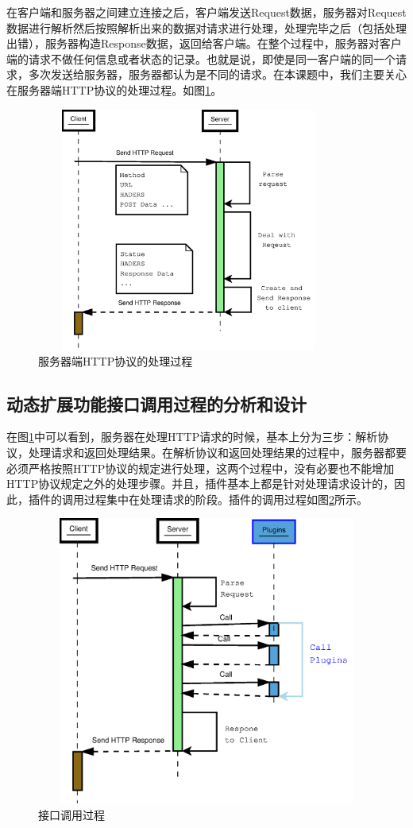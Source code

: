 \documentclass[12pt, twoside, a4paper, xetex]{report}
\begin{document}
	在客户端和服务器之间建立连接之后，客户端发送Request数据，服务器对Request数据进行解析然后按照解析出来的数据对请求进行处理，处理完毕之后（包括处理出错），服务器构造Response数据，返回给客户端。在整个过程中，服务器对客户端的请求不做任何信息或者状态的记录。也就是说，即使是同一客户端的同一个请求，多次发送给服务器，服务器都认为是不同的请求。在本课题中，我们主要关心在服务器端HTTP协议的处理过程。如图\ref{serverhttp}。
	\begin{figure}[htbp]
	\centering
	\caption{服务器端HTTP协议的处理过程}
	\label{serverhttp}
	\includegraphics[height=8cm, width=10cm]{pics/serverhttp.eps}
	\end{figure}
	
\subsection{动态扩展功能接口调用过程的分析和设计}
	在图\ref{serverhttp}中可以看到，服务器在处理HTTP请求的时候，基本上分为三步：解析协议，处理请求和返回处理结果。在解析协议和返回处理结果的过程中，服务器都要必须严格按照HTTP协议的规定进行处理，这两个过程中，没有必要也不能增加HTTP协议规定之外的处理步骤。并且，插件基本上都是针对处理请求设计的，因此，插件的调用过程集中在处理请求的阶段。插件的调用过程如图\ref{httpplugin}所示。
	\begin{figure}[htbp]
	\centering
	\caption{接口调用过程}
	\label{httpplugin}
	\includegraphics[height=9.5cm, width=12cm]{pics/httpplugin.eps}
	\end{figure}
	
\end{document}
